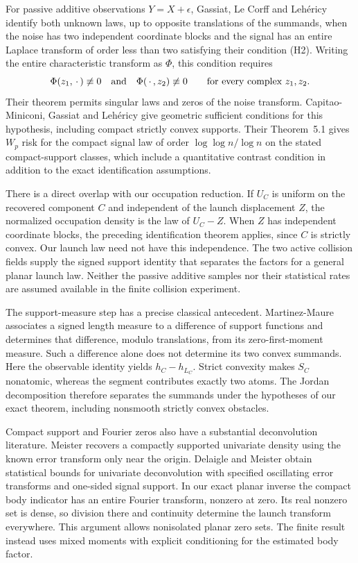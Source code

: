 For passive additive observations $Y=X+\epsilon$, Gassiat, Le Corff
and Leh\'ericy \cite[Theorem~2.1]{GLL} identify both unknown laws,
up to opposite translations of the summands, when the noise has two
independent coordinate blocks and the signal has an entire Laplace
transform of order less than two satisfying their condition (H2).
Writing the entire characteristic transform as $\Phi$, this condition
requires
\[
 \Phi(z_1,\,\cdot\,)\not\equiv0
 \quad\hbox{and}\quad
 \Phi(\,\cdot\,,z_2)\not\equiv0
 \qquad\hbox{for every complex }z_1,z_2.
\]
Their theorem permits singular laws and zeros of the noise transform.
Capitao-Miniconi, Gassiat and Leh\'ericy
\cite[Corollary~2.5]{CGLSupport} give geometric sufficient conditions
for this hypothesis, including compact strictly convex supports.
Their Theorem~5.1 gives $W_p$ risk for the compact signal law of order
$\log\log n/\log n$ on the stated compact-support classes, which
include a quantitative contrast condition in addition to the exact
identification assumptions.

There is a direct overlap with our occupation reduction. If $U_C$ is
uniform on the recovered component $C$ and independent of the launch
displacement $Z$, the normalized occupation density is the law of
$U_C-Z$. When $Z$ has independent coordinate blocks, the preceding
identification theorem applies, since $C$ is strictly convex. Our
launch law need not have this independence. The two active collision
fields supply the signed support identity that separates the factors
for a general planar launch law. Neither the passive additive samples
nor their statistical rates are assumed available in the finite
collision experiment.

The support-measure step has a precise classical antecedent.
Martinez-Maure \cite[Definition~4.4 and Theorem~4.6]{MartinezMaure}
associates a signed length measure to a difference of support
functions and determines that difference, modulo translations, from
its zero-first-moment measure. Such a difference alone does not
determine its two convex summands. Here the observable identity yields
$h_C-h_{L_C}$. Strict convexity makes $S_C$ nonatomic, whereas the
segment contributes exactly two atoms. The Jordan decomposition
therefore separates the summands under the hypotheses of our exact
theorem, including nonsmooth strictly convex obstacles.

Compact support and Fourier zeros also have a substantial
deconvolution literature. Meister \cite[Section~2 and Theorem~1]{MeisterCompact}
recovers a compactly supported univariate density using the known
error transform only near the origin. Delaigle and Meister
\cite[Theorem~4.1]{DelaigleMeister} obtain statistical bounds for
univariate deconvolution with specified oscillating error transforms
and one-sided signal support. In our exact planar inverse the compact
body indicator has an entire Fourier transform, nonzero at zero.
Its real nonzero set is dense, so division there and continuity
determine the launch transform everywhere. This argument allows
nonisolated planar zero sets. The finite result instead uses mixed
moments with explicit conditioning for the estimated body factor.

